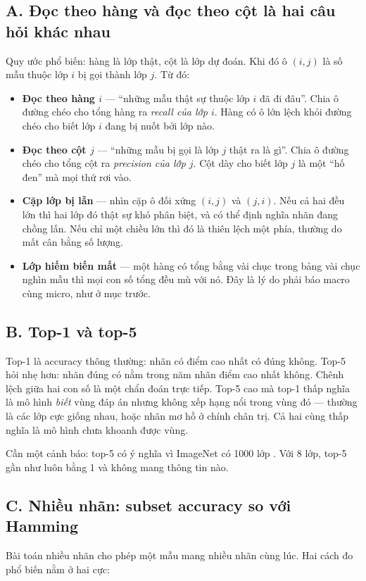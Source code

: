 \documentclass[../../deep_learning.tex]{subfiles}
\begin{document}
\subsection{A. Đọc theo hàng và đọc theo cột là hai câu hỏi khác nhau}
Quy ước phổ biến: hàng là lớp thật, cột là lớp dự đoán. Khi đó ô \((i,j)\) là số mẫu thuộc lớp \(i\) bị gọi thành lớp \(j\). Từ đó:

\begin{itemize}
\item \textbf{Đọc theo hàng \(i\)} --- ``những mẫu thật sự thuộc lớp \(i\) đã đi đâu''. Chia ô đường chéo cho tổng hàng ra \emph{recall của lớp \(i\)}. Hàng có ô lớn lệch khỏi đường chéo cho biết lớp \(i\) đang bị nuốt bởi lớp nào.
\item \textbf{Đọc theo cột \(j\)} --- ``những mẫu bị gọi là lớp \(j\) thật ra là gì''. Chia ô đường chéo cho tổng cột ra \emph{precision của lớp \(j\)}. Cột dày cho biết lớp \(j\) là một ``hố đen'' mà mọi thứ rơi vào.
\item \textbf{Cặp lớp bị lẫn} --- nhìn cặp ô đối xứng \((i,j)\) và \((j,i)\). Nếu cả hai đều lớn thì hai lớp đó thật sự khó phân biệt, và có thể định nghĩa nhãn đang chồng lấn. Nếu chỉ một chiều lớn thì đó là thiên lệch một phía, thường do mất cân bằng số lượng.
\item \textbf{Lớp hiếm biến mất} --- một hàng có tổng bằng vài chục trong bảng vài chục nghìn mẫu thì mọi con số tổng đều mù với nó. Đây là lý do phải báo macro cùng micro, như ở mục trước.
\end{itemize}

\subsection{B. Top-1 và top-5}
Top-1 là accuracy thông thường: nhãn có điểm cao nhất có đúng không. Top-5 hỏi nhẹ hơn: nhãn đúng có nằm trong năm nhãn điểm cao nhất không. Chênh lệch giữa hai con số là một chẩn đoán trực tiếp. Top-5 cao mà top-1 thấp nghĩa là mô hình \emph{biết} vùng đáp án nhưng không xếp hạng nổi trong vùng đó --- thường là các lớp cực giống nhau, hoặc nhãn mơ hồ ở chính chân trị. Cả hai cùng thấp nghĩa là mô hình chưa khoanh được vùng.

Cần một cảnh báo: top-5 có ý nghĩa vì ImageNet có 1000 lớp \cite{deng2009imagenet}. Với 8 lớp, top-5 gần như luôn bằng 1 và không mang thông tin nào.

\subsection{C. Nhiều nhãn: subset accuracy so với Hamming}
Bài toán nhiều nhãn cho phép một mẫu mang nhiều nhãn cùng lúc. Hai cách đo phổ biến nằm ở hai cực:
\end{document}
